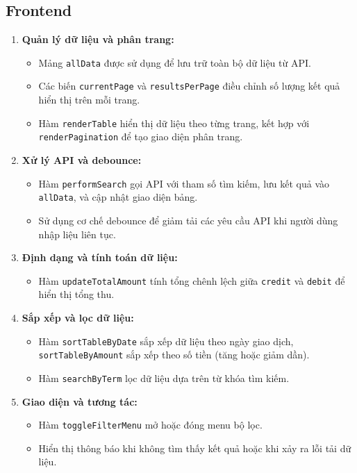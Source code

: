 \subsection{Frontend}
\begin{enumerate}
    \item \textbf{Quản lý dữ liệu và phân trang:}
    \begin{itemize}
        \item Mảng \texttt{allData} được sử dụng để lưu trữ toàn bộ dữ liệu từ API.
        \item Các biến \texttt{currentPage} và \texttt{resultsPerPage} điều chỉnh số lượng kết quả hiển thị trên mỗi trang.
        \item Hàm \texttt{renderTable} hiển thị dữ liệu theo từng trang, kết hợp với \texttt{renderPagination} để tạo giao diện phân trang.
    \end{itemize}

    \item \textbf{Xử lý API và debounce:}
    \begin{itemize}
        \item Hàm \texttt{performSearch} gọi API với tham số tìm kiếm, lưu kết quả vào \texttt{allData}, và cập nhật giao diện bảng.
        \item Sử dụng cơ chế debounce để giảm tải các yêu cầu API khi người dùng nhập liệu liên tục.
    \end{itemize}

    \item \textbf{Định dạng và tính toán dữ liệu:}
    \begin{itemize}
        \item Hàm \texttt{updateTotalAmount} tính tổng chênh lệch giữa \texttt{credit} và \texttt{debit} để hiển thị tổng thu.
    \end{itemize}

    \item \textbf{Sắp xếp và lọc dữ liệu:}
    \begin{itemize}
        \item Hàm \texttt{sortTableByDate} sắp xếp dữ liệu theo ngày giao dịch, \texttt{sortTableByAmount} sắp xếp theo số tiền (tăng hoặc giảm dần).
        \item Hàm \texttt{searchByTerm} lọc dữ liệu dựa trên từ khóa tìm kiếm.
    \end{itemize}

    \item \textbf{Giao diện và tương tác:}
    \begin{itemize}
        \item Hàm \texttt{toggleFilterMenu} mở hoặc đóng menu bộ lọc.
        \item Hiển thị thông báo khi không tìm thấy kết quả hoặc khi xảy ra lỗi tải dữ liệu.
    \end{itemize}
\end{enumerate}

